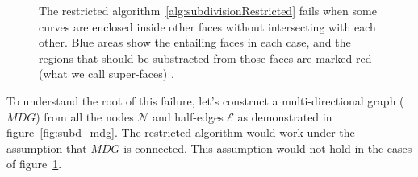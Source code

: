 \begin{figure}
\begin{subfigure}{.32\textwidth}
  \end{subfigure}%
  \caption[xxx]
          {The restricted algorithm~\ref{alg:subdivisionRestricted} fails when some curves are enclosed inside other faces without intersecting with each other.
          Blue areas show the entailing faces in each case, and the regions that should be substracted from those faces are marked red (what we call super-faces) .}
  \label{fig:subd_restrictedFail}
\end{figure}

To understand the root of this failure, let's construct a multi-directional graph ($\mathit{MDG}$) from all the nodes $\mathcal{N}$ and half-edges $\mathcal{E}$ as demonstrated in figure~\ref{fig:subd_mdg}.
The restricted algorithm would work under the assumption that $\mathit{MDG}$ is connected.
This assumption would not hold in the cases of figure~\ref{fig:subd_restrictedFail}.

